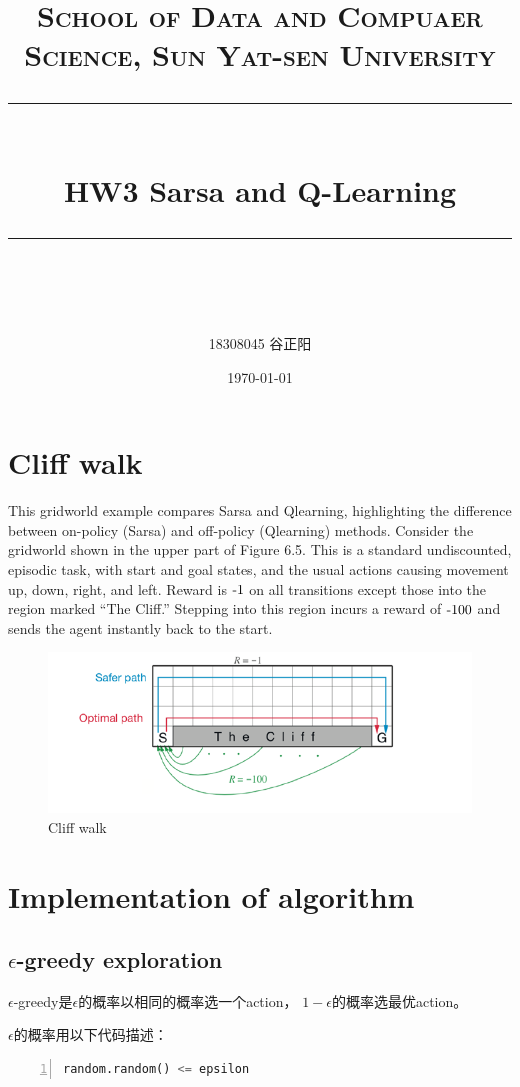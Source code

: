 \documentclass[a4paper, 11pt]{article}
\title{	
\normalfont \normalsize
\textsc{School of Data and Compuaer Science, Sun Yat-sen University} \\ [25pt] %
\rule{\textwidth}{0.5pt} \\[0.4cm] %
\huge  HW3 Sarsa and Q-Learning\\ %
\rule{\textwidth}{2pt} \\[0.5cm] %
\author{18308045 谷正阳}
\date{\normalsize\today}
}
\begin{document}
\maketitle
\tableofcontents
\newpage
\section{Cliff walk}

This gridworld example compares Sarsa and Qlearning,
highlighting the difference between on-policy (Sarsa) and off-policy (Qlearning) methods.
Consider the gridworld shown in the upper part of Figure 6.5.
This is a standard undiscounted, episodic task,
with start and goal states,
and the usual actions causing movement up, down, right, and left.
Reward is $\textnormal{-}1$ on all transitions except those into the region marked “The Cliff.”
Stepping into this region
incurs a reward of $\textnormal{-}100$ and sends the agent instantly back to the start.

\begin{figure}[H]
  \centering
  \includegraphics[width=16cm]{cliff_walk.png}
  \caption{Cliff walk}
\end{figure}

\section{Implementation of algorithm}

\subsection{$\epsilon$-greedy exploration}

$\epsilon$-greedy是$\epsilon$的概率以相同的概率选一个action，
$1-\epsilon$的概率选最优action。

$\epsilon$的概率用以下代码描述：

\begin{lstlisting}[frame=single,language=python,numbers=left]
random.random() <= epsilon
\end{lstlisting}
\end{document}
